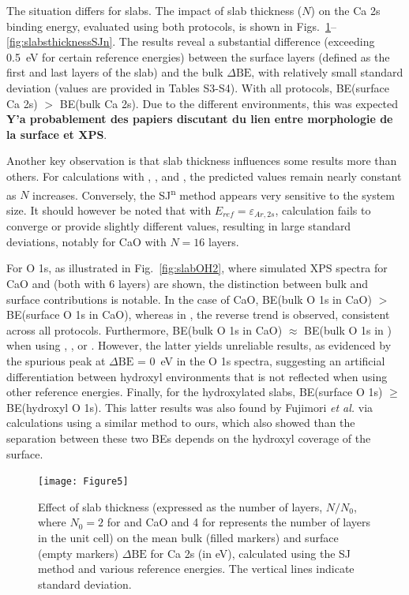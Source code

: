 \documentclass[journal=jpccck,manuscript=article]{achemso}
\def\dbe{\ensuremath{\Delta\text{BE}}}
\begin{document}
\clearpage

The situation differs for slabs. The impact of slab thickness ($N$) on the Ca 2s binding energy, evaluated using both protocols, is shown in Figs.~\ref{fig:slabsthicknessSJ}--\ref{fig:slabsthicknessSJn}. The results reveal a substantial difference (exceeding \SI{0.5}{\electronvolt} for certain reference energies) between the surface layers (defined as the first and last layers of the slab) and the bulk \dbe{}, with relatively small standard deviation (values are provided in Tables S3-S4). With all protocols, BE(surface Ca 2s) $>$ BE(bulk Ca 2s). Due to the different environments, this was expected \textbf{Y'a probablement des papiers discutant du lien entre morphologie de la surface et XPS}. 

Another key observation is that slab thickness influences some results more than others. For calculations with , , and , the predicted values remain nearly constant as $N$ increases. Conversely, the SJ\textsuperscript{n} method appears very sensitive to the system size. It should however be noted that with $E_{ref}=\varepsilon_{Ar,2s}$, calculation fails to converge or provide slightly different values, resulting in large standard deviations, notably for CaO with $N=16$ layers. 

For O 1s, as illustrated in Fig.~\ref{fig:slabOH2}, where simulated XPS spectra for CaO and  (both with 6 layers) are shown, the distinction between bulk and surface contributions is notable. In the case of CaO, BE(bulk O 1s in CaO) $>$ BE(surface O 1s in CaO), whereas in , the reverse trend is observed, consistent across all protocols. Furthermore, BE(bulk O 1s in CaO) $\approx$ BE(bulk O 1s in ) when using , , or . However, the latter yields unreliable results, as evidenced by the spurious peak at \dbe{} = \SI{0}{\electronvolt} in the O 1s spectra, suggesting an artificial differentiation between hydroxyl environments that is not reflected when using other reference energies. Finally, for the hydroxylated slabs, BE(surface O 1s) $\geq$ BE(hydroxyl O 1s). This latter results was also found by Fujimori \emph{et al.} \cite{fujimoriInteractionWaterCaO2016a} via calculations using a similar method to ours, which also showed than the separation between these two BEs depends on the hydroxyl coverage of the surface.



\begin{figure}[!h]
	\centering
	\texttt{[image: Figure5]}
	\caption{Effect of slab thickness (expressed as the number of layers, $N/N_0$, where $N_0 = 2$ for  and CaO and 4 for  represents the number of layers in the unit cell) on the mean bulk (filled markers) and surface (empty markers) \dbe{} for Ca 2s (in \si{\electronvolt}), calculated using the SJ method and various reference energies. The vertical lines indicate standard deviation.}
	\label{fig:slabsthicknessSJ}
\end{figure}
\end{document}
